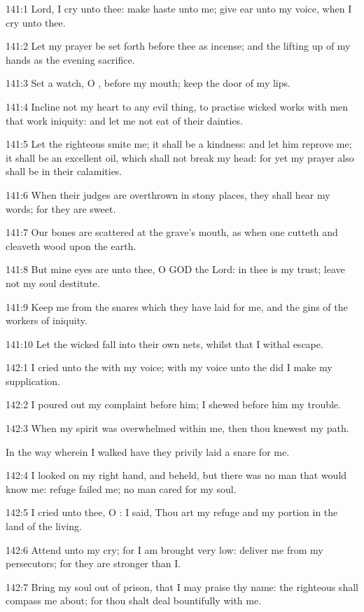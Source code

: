 141:1 Lord, I cry unto thee: make haste unto me; give ear unto my
voice, when I cry unto thee.

141:2 Let my prayer be set forth before thee as incense; and the
lifting up of my hands as the evening sacrifice.

141:3 Set a watch, O \LORD, before my mouth; keep the door of my lips.

141:4 Incline not my heart to any evil thing, to practise wicked works
with men that work iniquity: and let me not eat of their dainties.

141:5 Let the righteous smite me; it shall be a kindness: and let him
reprove me; it shall be an excellent oil, which shall not break my
head: for yet my prayer also shall be in their calamities.

141:6 When their judges are overthrown in stony places, they shall
hear my words; for they are sweet.

141:7 Our bones are scattered at the grave's mouth, as when one
cutteth and cleaveth wood upon the earth.

141:8 But mine eyes are unto thee, O GOD the Lord: in thee is my
trust; leave not my soul destitute.

141:9 Keep me from the snares which they have laid for me, and the
gins of the workers of iniquity.

141:10 Let the wicked fall into their own nets, whilst that I withal
escape.



142:1 I cried unto the \LORD with my voice; with my voice unto the \LORD
did I make my supplication.

142:2 I poured out my complaint before him; I shewed before him my
trouble.

142:3 When my spirit was overwhelmed within me, then thou knewest my
path.

In the way wherein I walked have they privily laid a snare for me.

142:4 I looked on my right hand, and beheld, but there was no man that
would know me: refuge failed me; no man cared for my soul.

142:5 I cried unto thee, O \LORD: I said, Thou art my refuge and my
portion in the land of the living.

142:6 Attend unto my cry; for I am brought very low: deliver me from
my persecutors; for they are stronger than I.

142:7 Bring my soul out of prison, that I may praise thy name: the
righteous shall compass me about; for thou shalt deal bountifully with
me.



